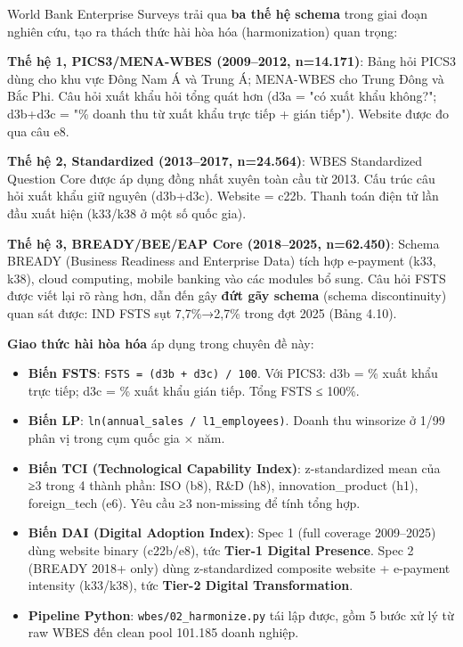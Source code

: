 \documentclass[12pt,a4paper]{article}
\providecommand{\tightlist}{\setlength{\itemsep}{0pt}\setlength{\parskip}{0pt}}
\begin{document}
World Bank Enterprise Surveys trải qua \textbf{ba thế hệ schema} trong
giai đoạn nghiên cứu, tạo ra thách thức hài hòa hóa (harmonization) quan
trọng:

\textbf{Thế hệ 1, PICS3/MENA-WBES (2009--2012, n=14.171)}: Bảng hỏi
PICS3 dùng cho khu vực Đông Nam Á và Trung Á; MENA-WBES cho Trung Đông
và Bắc Phi. Câu hỏi xuất khẩu hỏi tổng quát hơn (d3a = "có xuất khẩu
không?"; d3b+d3c = "\% doanh thu từ xuất khẩu trực tiếp + gián tiếp").
Website được đo qua câu e8.

\textbf{Thế hệ 2, Standardized (2013--2017, n=24.564)}: WBES
Standardized Question Core được áp dụng đồng nhất xuyên toàn cầu từ
2013. Cấu trúc câu hỏi xuất khẩu giữ nguyên (d3b+d3c). Website = c22b.
Thanh toán điện tử lần đầu xuất hiện (k33/k38 ở một số quốc gia).

\textbf{Thế hệ 3, BREADY/BEE/EAP Core (2018--2025, n=62.450)}: Schema
BREADY (Business Readiness and Enterprise Data) tích hợp e-payment (k33,
k38), cloud computing, mobile banking vào các modules bổ sung. Câu hỏi
FSTS được viết lại rõ ràng hơn, dẫn đến gây \textbf{đứt gãy schema}
(schema discontinuity) quan sát được: IND FSTS sụt 7,7\%→2,7\% trong đợt
2025 (Bảng 4.10).

\textbf{Giao thức hài hòa hóa} áp dụng trong chuyên đề này:

\begin{itemize}
\tightlist
\item
  \textbf{Biến FSTS}: \texttt{FSTS\ =\ (d3b\ +\ d3c)\ /\ 100}. Với
  PICS3: d3b = \% xuất khẩu trực tiếp; d3c = \% xuất khẩu gián tiếp.
  Tổng FSTS ≤ 100\%.
\item
  \textbf{Biến LP}: \texttt{ln(annual\_sales\ /\ l1\_employees)}. Doanh
  thu winsorize ở 1/99 phân vị trong cụm quốc gia × năm.
\item
  \textbf{Biến TCI (Technological Capability Index)}: z-standardized
  mean của ≥3 trong 4 thành phần: ISO (b8), R\&D (h8),
  innovation\_product (h1), foreign\_tech (e6). Yêu cầu ≥3 non-missing
  để tính tổng hợp.
\item
  \textbf{Biến DAI (Digital Adoption Index)}: Spec 1 (full coverage
  2009--2025) dùng website binary (c22b/e8), tức \textbf{Tier-1 Digital
  Presence}. Spec 2 (BREADY 2018+ only) dùng z-standardized composite
  website + e-payment intensity (k33/k38), tức \textbf{Tier-2 Digital
  Transformation}.
\item
  \textbf{Pipeline Python}: \texttt{wbes/02\_harmonize.py} tái lập được,
  gồm 5 bước xử lý từ raw WBES đến clean pool 101.185 doanh nghiệp.
\end{itemize}
\end{document}
